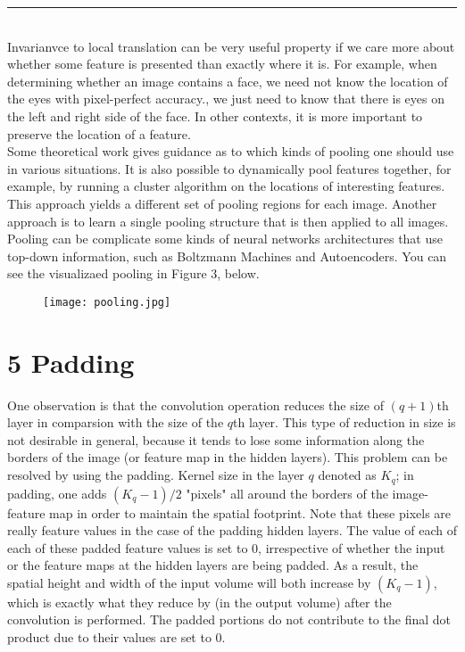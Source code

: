 \documentclass[11pt]{article}
\begin{document}
\par\noindent\rule{\textwidth}{0.5pt}\\
Invarianvce to local translation can be very useful property if we care more about whether some feature is presented than exactly where it is. For example, when determining whether an image contains a face, we need not know the location of the eyes with pixel-perfect accuracy., we just need to know that there is eyes on the left and right side of the face. In other contexts, it is more important to preserve the location of a feature. \\
Some theoretical work gives guidance as to which kinds of pooling one should use in various situations. It is also possible to dynamically pool features together, for example, by running a cluster algorithm on the locations of interesting features. This approach yields a different set of pooling regions for each image. Another approach is to learn a single pooling structure that is then applied to all images.\\
Pooling can be complicate some kinds of neural networks architectures that use top-down information, such as Boltzmann Machines and Autoencoders. You can see the visualizaed pooling in Figure 3, below. 
\begin{figure}[H]

\centering
\texttt{[image: pooling.jpg]}
\caption{}
\label{fig:figure3}
\end{figure}
\section{5 Padding}
\hspace*{1cm} One observation is that the convolution operation reduces the size of $(q+1)$th layer in comparsion with the size of the $q$th layer. This type of reduction in size is not desirable in general, because it tends to lose some information along the borders of the image (or feature map in the hidden layers). This problem can be resolved by using the padding. Kernel size in the layer $q$ denoted as $K_q$; in padding, one adds $(K_q-1)/2$ "pixels" all around the borders of the image-feature map in order to maintain the spatial footprint. Note that these pixels are really feature values in the case of the padding hidden layers. The value of each of each of these padded feature values is set to 0, irrespective of whether the input or the feature maps at the hidden layers are being padded. As a result, the spatial height and width of the input volume will both increase by $(K_q-1)$, which is exactly what they reduce by (in the output volume) after the convolution is performed. The padded portions do not contribute to the final dot product due to their values are set to 0. 
\end{document}
